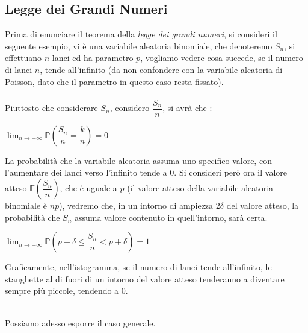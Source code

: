 \documentclass[12pt, letterpaper]{article}
\newcommand{\E}{{\mathbb E}}
\newcommand{\acc}{\\\hphantom{}\\}
\newcommand{\Prob}{{\mathbb P}}
\begin{document}
\subsection{Legge dei Grandi Numeri}
Prima di enunciare il teorema della \textit{legge dei grandi numeri}, si consideri il seguente esempio, vi è 
una variabile aleatoria binomiale, che denoteremo \(S_n\), si effettuano \(n\) lanci ed ha parametro \(p\), vogliamo 
vedere cosa succede, se il numero di lanci \(n\), tende all'infinito (da non confondere con la variabile 
aleatoria di Poisson, dato che il parametro in questo caso resta fissato).\acc 
Piuttosto che considerare \(S_n\), considero \(\dfrac{S_n}{n}\), si avrà che :\begin{center}
    \(\displaystyle\lim_{n\rightarrow +\infty}\Prob(\dfrac{S_n}{n}=\dfrac{k}{n})=0\)
\end{center}
La probabilità che la variabile aleatoria assuma uno specifico valore, con l'aumentare dei lanci verso l'infinito 
tende a 0. Si consideri però ora il valore atteso \(\E(\dfrac{S_n}{n})\), che è uguale a \(p\) (il valore 
atteso della variabile aleatoria binomiale è \(np\)), vedremo che, in un intorno di 
ampiezza \(2\delta\) del valore atteso, la probabilità che \(S_n\) assuma valore contenuto in quell'intorno, 
sarà certa.\begin{center}
    \(\displaystyle\lim_{n\rightarrow +\infty}\Prob(p-\delta\le\dfrac{S_n}{n}<p+\delta)=1\)
\end{center}
Graficamente, nell'istogramma, se il numero di lanci tende all'infinito, le stanghette al di fuori di un 
intorno del valore atteso tenderanno a diventare sempre più piccole, tendendo a 0.
\begin{figure}[h]
\end{figure}\\
Possiamo adesso esporre il caso generale.
\end{document}
